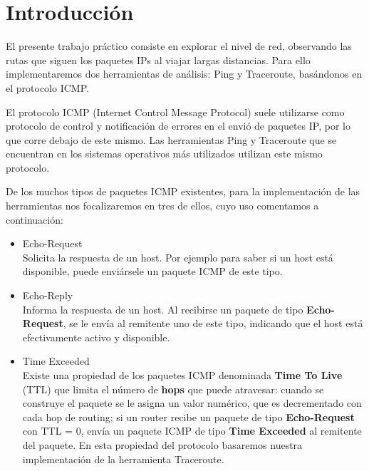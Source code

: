 \section{Introducci\'on}

El presente trabajo pr\'actico consiste en explorar el nivel de red, observando las rutas que siguen los paquetes IPs al viajar largas distancias. Para ello implementaremos dos herramientas de análisis: Ping y Traceroute,  basándonos en el protocolo ICMP.

El protocolo ICMP (Internet Control Message Protocol) suele utilizarse como protocolo de control y notificaci\'on de errores en el envi\'o de paquetes IP, por lo que corre debajo de este mismo. Las herramientas Ping y Traceroute que se encuentran en los sistemas operativos más utilizados utilizan este mismo protocolo.

De los muchos tipos de paquetes ICMP existentes, para la implementaci\'on de las herramientas nos focalizaremos en tres de ellos, cuyo uso comentamos a continuación:

\begin{itemize}
 \item Echo-Request \\ 
 Solicita la respuesta de un host. Por ejemplo para saber si un host está disponible, puede enviársele un paquete ICMP de este tipo.
 \item Echo-Reply \\
 Informa la respuesta de un host. Al recibirse un paquete de tipo {\bf Echo-Request}, se le envía al remitente uno de este tipo, indicando que el host está efectivamente activo y disponible.
 \item Time Exceeded \\
 Existe una propiedad de los paquetes ICMP denominada {\bf Time To Live} (TTL) que limita el número de {\bf hops} que puede atravesar: cuando se construye el paquete se le asigna un valor numérico, que es decrementado con cada hop de routing; si un router recibe un paquete de tipo {\bf Echo-Request} con TTL = 0, envía un paquete ICMP de tipo {\bf Time Exceeded} al remitente del paquete. En esta propiedad del protocolo basaremos nuestra implementación de la herramienta Traceroute.
\end{itemize}


